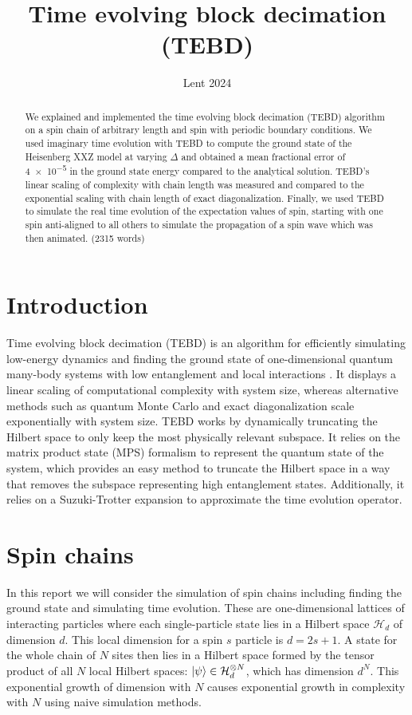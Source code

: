 \documentclass[a4paper, headsepline, footheight=13.6pt]{scrartcl}
\title{Time evolving block decimation (TEBD)}
\date{Lent 2024}
\begin{document}

\maketitle
\newpage
\begin{abstract}
We explained and implemented the time evolving block decimation (TEBD) algorithm on a spin chain of arbitrary length and spin with periodic boundary conditions. We used imaginary time evolution with TEBD to compute the ground state of the Heisenberg XXZ model at varying $\Delta$ and obtained a mean fractional error of \qty{4e-5}{} in the ground state energy compared to the analytical solution. TEBD's linear scaling of complexity with chain length was measured and compared to the exponential scaling with chain length of exact diagonalization. Finally, we used TEBD to simulate the real time evolution of the expectation values of spin, starting with one spin anti-aligned to all others to simulate the propagation of a spin wave which was then animated. (2315 words)
\end{abstract}

\section{Introduction}
Time evolving block decimation (TEBD) is an algorithm for efficiently simulating low-energy dynamics and finding the ground state of one-dimensional quantum many-body systems with low entanglement and local interactions \cite{Vidal:2004aa}. It displays a linear scaling of computational complexity with system size, whereas alternative methods such as quantum Monte Carlo \cite{Barker:1979aa} and exact diagonalization scale exponentially with system size. TEBD works by dynamically truncating the Hilbert space to only keep the most physically relevant subspace. It relies on the matrix product state (MPS) formalism to represent the quantum state of the system, which provides an easy method to truncate the Hilbert space in a way that removes the subspace representing high entanglement states. Additionally, it relies on a Suzuki-Trotter expansion \cite{Suzuki:1990aa} to approximate the time evolution operator.

\section{Spin chains}
In this report we will consider the simulation of spin chains including finding the ground state and simulating time evolution. These are one-dimensional lattices of interacting particles where each single-particle state lies in a Hilbert space $\mathcal{H}_d$ of dimension $d$. This local dimension for a spin $s$ particle is $d=2s+1$. A state for the whole chain of $N$ sites then lies in a Hilbert space formed by the tensor product of all $N$ local Hilbert spaces: $\ket{\psi} \in \mathcal{H}^{\otimes N}_d$, which has dimension $d^N$. This exponential growth of dimension with $N$ causes exponential growth in complexity with $N$ using naive simulation methods.
\end{document}
